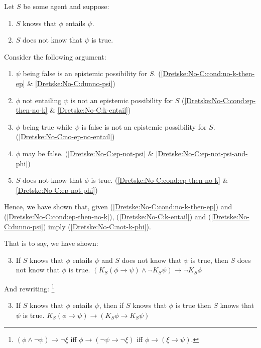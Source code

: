 \begin{note}
  Let \(S\) be some agent and suppose:
  \begin{enumerate}[label=\arabic*., ref=\arabic*]
  \item\label{Dretske:No-C:k-entail} \(S\) knows that \(\phi\) entails \(\psi\).
  \item\label{Dretske:No-C:dunno-psi} \(S\) does not know that \(\psi\) is true.
  \end{enumerate}
  Consider the following argument:
  \begin{enumerate}[label=\arabic*., ref=\arabic*,resume]
  \item\label{Dretske:No-C:ep-not-psi} \(\psi\) being false is an epistemic possibility for \(S\).%
    \hfill (\ref{Dretske:No-C:cond:no-k-then-ep} \& \ref{Dretske:No-C:dunno-psi})
  \item\label{Dretske:No-C:no-ep-no-entail} \(\phi\) not entailing \(\psi\) is not an epistemic possibility for \(S\)%
    \hfill (\ref{Dretske:No-C:cond:ep-then-no-k} \& \ref{Dretske:No-C:k-entail})
  \item\label{Dretske:No-C:ep-not-psi-and-phi}  \(\phi\) being true while \(\psi\) is false is not an epistemic possibility for \(S\).%
    \hfill (\ref{Dretske:No-C:no-ep-no-entail})
  \item\label{Dretske:No-C:ep-not-phi} \(\phi\) may be false.%
    \hfill (\ref{Dretske:No-C:ep-not-psi} \& \ref{Dretske:No-C:ep-not-psi-and-phi})
  \item\label{Dretske:No-C:not-k-phi} \(S\) does not know that \(\phi\) is true.%
    \hfill (\ref{Dretske:No-C:cond:ep-then-no-k} \& \ref{Dretske:No-C:ep-not-phi})
  \end{enumerate}

  Hence, we have shown that, given (\ref{Dretske:No-C:cond:no-k-then-ep}) and (\ref{Dretske:No-C:cond:ep-then-no-k}), (\ref{Dretske:No-C:k-entail}) and (\ref{Dretske:No-C:dunno-psi}) imply (\ref{Dretske:No-C:not-k-phi}).

  That is to say, we have shown:
  \begin{enumerate}[label=K\Alph*., ref=(K\Alph*)]
    \setcounter{enumi}{2}
  \item\label{K:closure:from-arg} If \(S\) knows that \(\phi\) entails \(\psi\) and \(S\) does not know that \(\psi\) is true, then \(S\) does not know that \(\phi\) is true.%
    \mbox{} \hfill \((K_{S}(\phi \rightarrow \psi) \land \lnot K_{S}\psi) \rightarrow \lnot K_{S}\phi\)
  \end{enumerate}
  And rewriting:\nolinebreak
  \footnote{
    \((\phi \land \lnot\psi) \rightarrow \lnot\xi\) iff \(\phi \rightarrow (\lnot\psi \rightarrow \lnot\xi)\) iff \(\phi \rightarrow (\xi \rightarrow \psi)\).
  }
  \begin{enumerate}[label=K\Alph*\('\)., ref=(K\Alph*\('\))]
    \setcounter{enumi}{2}
  \item\label{K:closure:standard} If \(S\) knows that \(\phi\) entails \(\psi\), then if \(S\) knows that \(\phi\) is true then \(S\) knows that \(\psi\) is true.%
    \mbox{} \hfill \(K_{S}(\phi \rightarrow \psi) \rightarrow (K_{S}\phi \rightarrow K_{S}\psi)\)
  \end{enumerate}
\end{note}

